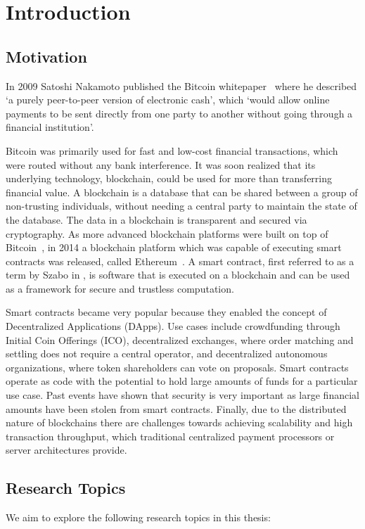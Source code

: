 \chapter{Introduction}

\section{Motivation}
In 2009 Satoshi Nakamoto published the Bitcoin whitepaper~\cite{bitcoin} where he described `a purely peer-to-peer version of electronic cash', which `would allow online payments to be sent directly from one party to another without going through a financial institution'.

Bitcoin was primarily used for fast and low-cost financial transactions, which were routed without any bank interference. It was soon realized that its underlying technology, blockchain, could be used for more than transferring financial value. A blockchain is a database that can be shared between a group of non-trusting individuals, without needing a central party to maintain the state of the database. The data in a blockchain is transparent and secured via cryptography. As more advanced blockchain platforms were built on top of Bitcoin~\cite{colored}, in 2014 a blockchain platform which was capable of executing smart contracts was released, called Ethereum~\cite{vitalik}. A smart contract, first referred to as a term by Szabo in \cite{szabo}, is software that is executed on a blockchain and can be used as a framework for secure and trustless computation.

Smart contracts became very popular because they enabled the concept of Decentralized Applications (DApps). Use cases include crowdfunding through Initial Coin Offerings (ICO), decentralized exchanges, where order matching and settling does not require a central operator, and decentralized autonomous organizations, where token shareholders can vote on proposals. Smart contracts operate as code with the potential to hold large amounts of funds for a particular use case. Past events have shown that security is very important as large financial amounts have been stolen from smart contracts. Finally, due to the distributed nature of blockchains there are challenges towards achieving scalability and high transaction throughput, which traditional centralized payment processors or server architectures provide.

\section{Research Topics}
We aim to explore the following research topics in this thesis:

